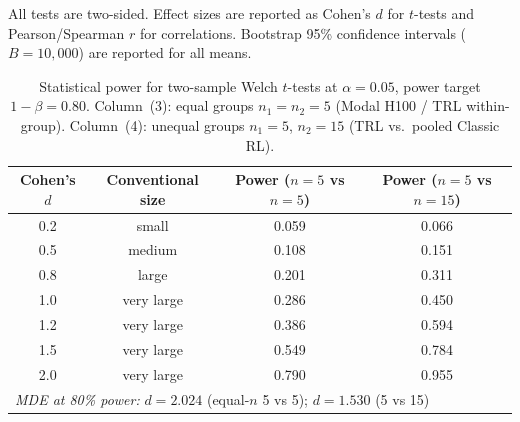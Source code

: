 \documentclass{article}
\begin{document}
All tests are two-sided.  Effect sizes are reported as Cohen's $d$ for
$t$-tests and Pearson/Spearman $r$ for correlations.  Bootstrap 95\%
confidence intervals ($B = 10{,}000$) are reported for all means.

\begin{table}[!ht]
\centering
\caption{Statistical power for two-sample Welch $t$-tests at $\alpha = 0.05$,
         power target $1{-}\beta = 0.80$.
         Column~(3): equal groups $n_1 = n_2 = 5$ (Modal H100 / TRL within-group).
         Column~(4): unequal groups $n_1 = 5$, $n_2 = 15$ (TRL vs.\ pooled Classic RL).}
\label{tab:power-analysis}
\small
\begin{tabular}{@{}cccc@{}}
\toprule
Cohen's $d$ & Conventional size & Power ($n{=}5$ vs $n{=}5$) & Power ($n{=}5$ vs $n{=}15$) \\
\midrule
        0.2 & small & 0.059 & 0.066 \\
        0.5 & medium & 0.108 & 0.151 \\
        0.8 & large & 0.201 & 0.311 \\
        1.0 & very large & 0.286 & 0.450 \\
        1.2 & very large & 0.386 & 0.594 \\
        1.5 & very large & 0.549 & 0.784 \\
        2.0 & very large & 0.790 & 0.955 \\
\midrule
\multicolumn{4}{l}{\textit{MDE at 80\% power:} $d = 2.024$ (equal-$n$ 5 vs 5);\; $d = 1.530$ (5 vs 15)} \\
\bottomrule
\end{tabular}
\end{table}
\end{document}
